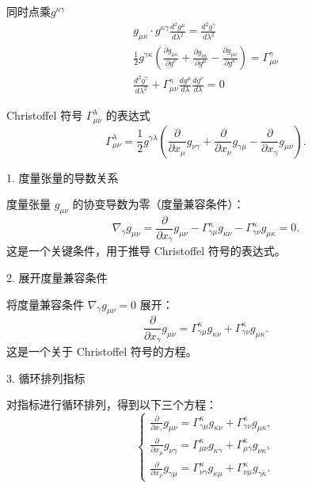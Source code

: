 \documentclass[12pt, a4paper, oneside, UTF8]{ctexbook}  %
\newcommand{\pa}{\partial}
\begin{document}
\begin{example}
\begin{tui}
        同时点乘$g^{\kappa\gamma}$
        \begin{gather*}
            g_{\mu\kappa}\cdot g^{\kappa\gamma}\frac{d^2g^\mu}{d\lambda^2}
            =\frac{d^2g^\gamma}{d\lambda^2}\\
            \frac{1}{2}g^{\gamma\kappa}\left(\frac{\pa g_{\mu\kappa}}{\pa g^\nu}
            +\frac{\pa g_{\nu\kappa}}{\pa g^\mu}-\frac{\pa g_{\mu\nu}}{\pa g^\kappa}\right)
            =\Gamma^\gamma_{\mu\nu}\\
            \frac{d^2g^\gamma}{d\lambda^2}+\Gamma^\gamma_{\mu\nu}\frac{dg^\mu}{d\lambda}\frac{dg^\nu}{d\lambda}=0
        \end{gather*}        
    \end{tui}
\end{example}
\begin{lemma}
    Christoffel 符号 $\Gamma^\lambda_{\mu\nu}$ 的表达式
    \[
           \Gamma^\lambda_{\mu\nu} = \frac{1}{2} g^{\gamma\lambda} \left( \frac{\pa}{\pa x_\mu} g_{\nu\gamma} + \frac{\pa}{\pa x_\nu} g_{\gamma\mu} - \frac{\pa}{\pa x_\gamma} g_{\mu\nu} \right).
    \]  
    \begin{tui}
        1. 度量张量的导数关系
        
           度量张量 \(g_{\mu\nu}\) 的协变导数为零（度量兼容条件）：
           \[
           \nabla_\gamma g_{\mu\nu} = \frac{\pa}{\pa x_\gamma} g_{\mu\nu} - \Gamma^\kappa_{\gamma\mu} g_{\kappa\nu} - \Gamma^\kappa_{\gamma\nu} g_{\mu\kappa} = 0.
           \]
           这是一个关键条件，用于推导 Christoffel 符号的表达式。
        
        2. 展开度量兼容条件
        
           将度量兼容条件 \(\nabla_\gamma g_{\mu\nu} = 0\) 展开：
           \[
           \frac{\pa}{\pa x_\gamma} g_{\mu\nu} = \Gamma^\kappa_{\gamma\mu} g_{\kappa\nu} + \Gamma^\kappa_{\gamma\nu} g_{\mu\kappa}.
           \]
           这是一个关于 Christoffel 符号的方程。
        
        3. 循环排列指标
        
           对指标进行循环排列，得到以下三个方程：
           \[
           \begin{cases}
           \frac{\pa}{\pa x_\gamma} g_{\mu\nu} = \Gamma^\kappa_{\gamma\mu} g_{\kappa\nu} + \Gamma^\kappa_{\gamma\nu} g_{\mu\kappa}, \\
           \frac{\pa}{\pa x_\mu} g_{\nu\gamma} = \Gamma^\kappa_{\mu\nu} g_{\kappa\gamma} + \Gamma^\kappa_{\mu\gamma} g_{\nu\kappa}, \\
           \frac{\pa}{\pa x_\nu} g_{\gamma\mu} = \Gamma^\kappa_{\nu\gamma} g_{\kappa\mu} + \Gamma^\kappa_{\nu\mu} g_{\gamma\kappa}.
           \end{cases}
           \]
        

\end{tui}
\end{lemma}
\end{document}
